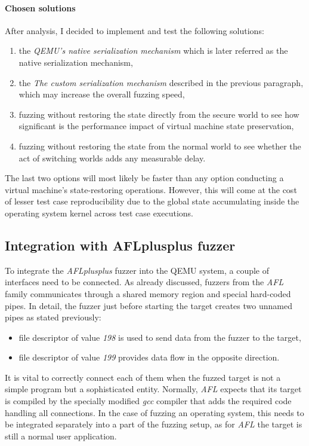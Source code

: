 \paragraph{Chosen solutions}
After analysis, I decided to implement and test the following solutions:
\begin{enumerate}
    \item the \textit{QEMU's native serialization mechanism} which is later referred as the native serialization mechanism,
    \item the \textit{The custom serialization mechanism} described in the previous paragraph, which may increase the overall fuzzing speed,
    \item fuzzing without restoring the state directly from the secure world to see how significant is the performance impact of virtual machine state preservation,
    \item fuzzing without restoring the state from the normal world to see whether the act of switching worlds adds any measurable delay.
\end{enumerate}
The last two options will most likely be faster than any option conducting a virtual machine's state-restoring operations. However, this will come at the cost of lesser test case reproducibility due to the global state accumulating inside the operating system kernel across test case executions. 

\clearpage
\subsection{Integration with AFLplusplus fuzzer} \label{sec:translator}
To integrate the \textit{AFLplusplus} fuzzer into the QEMU system, a couple of interfaces need to be connected. As already discussed, fuzzers from the \textit{AFL} family communicates through a shared memory region and special hard-coded pipes. In detail, the fuzzer just before starting the target creates two unnamed pipes as stated previously:
\begin{itemize}
    \item file descriptor of value \textit{198} is used to send data from the fuzzer to the target,
    \item file descriptor of value \textit{199} provides data flow in the opposite direction.
\end{itemize}
It is vital to correctly connect each of them when the fuzzed target is not a simple program but a sophisticated entity. Normally, \textit{AFL} expects that its target is compiled by the specially modified \textit{gcc} compiler that adds the required code handling all connections. In the case of fuzzing an operating system, this needs to be integrated separately into a part of the fuzzing setup, as for \textit{AFL} the target is still a normal user application. 

